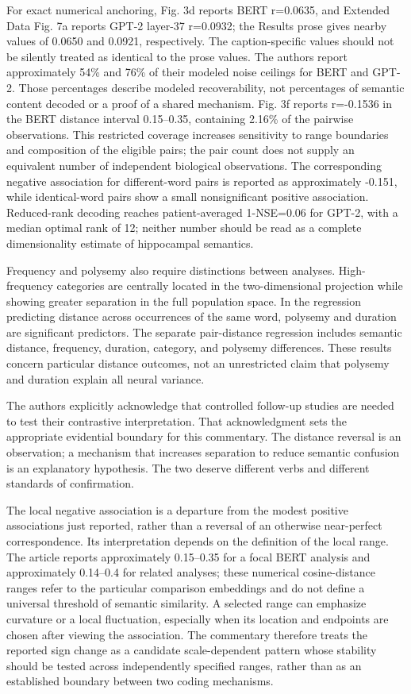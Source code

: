 \documentclass[11pt]{article}
\begin{document}
For exact numerical anchoring, Fig. 3d reports BERT r=0.0635, and
Extended Data Fig. 7a reports GPT-2 layer-37 r=0.0932; the Results prose
gives nearby values of 0.0650 and 0.0921, respectively. The
caption-specific values should not be silently treated as identical to
the prose values. The authors report approximately 54\% and 76\% of
their modeled noise ceilings for BERT and GPT-2. Those percentages
describe modeled recoverability, not percentages of semantic content
decoded or a proof of a shared mechanism. Fig. 3f reports r=-0.1536 in
the BERT distance interval 0.15--0.35, containing 2.16\% of the pairwise
observations. This restricted coverage increases sensitivity to range
boundaries and composition of the eligible pairs; the pair count does
not supply an equivalent number of independent biological observations.
The corresponding negative association for different-word pairs is
reported as approximately -0.151, while identical-word pairs show a
small nonsignificant positive association. Reduced-rank decoding reaches
patient-averaged 1-NSE=0.06 for GPT-2, with a median optimal rank of 12;
neither number should be read as a complete dimensionality estimate of
hippocampal semantics.

Frequency and polysemy also require distinctions between analyses.
High-frequency categories are centrally located in the two-dimensional
projection while showing greater separation in the full population
space. In the regression predicting distance across occurrences of the
same word, polysemy and duration are significant predictors. The
separate pair-distance regression includes semantic distance, frequency,
duration, category, and polysemy differences. These results concern
particular distance outcomes, not an unrestricted claim that polysemy
and duration explain all neural variance.

The authors explicitly acknowledge that controlled follow-up studies are
needed to test their contrastive interpretation. That acknowledgment
sets the appropriate evidential boundary for this commentary. The
distance reversal is an observation; a mechanism that increases
separation to reduce semantic confusion is an explanatory hypothesis.
The two deserve different verbs and different standards of confirmation.

The local negative association is a departure from the modest positive
associations just reported, rather than a reversal of an otherwise
near-perfect correspondence. Its interpretation depends on the
definition of the local range. The article reports approximately
0.15--0.35 for a focal BERT analysis and approximately 0.14--0.4 for
related analyses; these numerical cosine-distance ranges refer to the
particular comparison embeddings and do not define a universal threshold
of semantic similarity. A selected range can emphasize curvature or a
local fluctuation, especially when its location and endpoints are chosen
after viewing the association. The commentary therefore treats the
reported sign change as a candidate scale-dependent pattern whose
stability should be tested across independently specified ranges, rather
than as an established boundary between two coding mechanisms.
\end{document}
